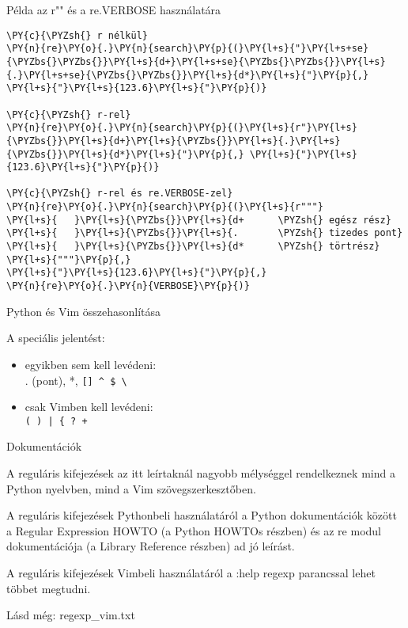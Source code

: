 \documentclass[
    ignorenonframetext
    ]{beamer}
\begin{document}
\begin{frame}
    [fragile]{Példa az r"" és a re.VERBOSE használatára}


\begin{Verbatim}[commandchars=\\\{\}]
\PY{c}{\PYZsh{} r nélkül}
\PY{n}{re}\PY{o}{.}\PY{n}{search}\PY{p}{(}\PY{l+s}{"}\PY{l+s+se}{\PYZbs{}\PYZbs{}}\PY{l+s}{d+}\PY{l+s+se}{\PYZbs{}\PYZbs{}}\PY{l+s}{.}\PY{l+s+se}{\PYZbs{}\PYZbs{}}\PY{l+s}{d*}\PY{l+s}{"}\PY{p}{,} \PY{l+s}{"}\PY{l+s}{123.6}\PY{l+s}{"}\PY{p}{)}

\PY{c}{\PYZsh{} r-rel}
\PY{n}{re}\PY{o}{.}\PY{n}{search}\PY{p}{(}\PY{l+s}{r"}\PY{l+s}{\PYZbs{}}\PY{l+s}{d+}\PY{l+s}{\PYZbs{}}\PY{l+s}{.}\PY{l+s}{\PYZbs{}}\PY{l+s}{d*}\PY{l+s}{"}\PY{p}{,} \PY{l+s}{"}\PY{l+s}{123.6}\PY{l+s}{"}\PY{p}{)}

\PY{c}{\PYZsh{} r-rel és re.VERBOSE-zel}
\PY{n}{re}\PY{o}{.}\PY{n}{search}\PY{p}{(}\PY{l+s}{r"""}
\PY{l+s}{   }\PY{l+s}{\PYZbs{}}\PY{l+s}{d+      \PYZsh{} egész rész}
\PY{l+s}{   }\PY{l+s}{\PYZbs{}}\PY{l+s}{.       \PYZsh{} tizedes pont}
\PY{l+s}{   }\PY{l+s}{\PYZbs{}}\PY{l+s}{d*      \PYZsh{} törtrész}
\PY{l+s}{"""}\PY{p}{,}
\PY{l+s}{"}\PY{l+s}{123.6}\PY{l+s}{"}\PY{p}{,}
\PY{n}{re}\PY{o}{.}\PY{n}{VERBOSE}\PY{p}{)}
\end{Verbatim}
\end{frame}

\begin{frame}[fragile]
    {Python és Vim összehasonlítása}

    A speciális jelentést:
    \begin{itemize}
        \item egyikben sem kell levédeni:\\
            . (pont), *, \verb'[] ^ $ \'
        \item csak Vimben kell levédeni:\\
            \verb!( ) | { ? +!
    \end{itemize}
\end{frame}

\begin{frame}
    {Dokumentációk}

    A reguláris kifejezések az itt leírtaknál nagyobb mélységgel
    rendelkeznek mind a Python nyelvben, mind a Vim szövegszerkesztőben.

    A reguláris kifejezések Pythonbeli használatáról a Python
    dokumentációk között a Regular Expression HOWTO (a Python HOWTOs
    részben) és az re modul dokumentációja (a Library Reference részben)
    ad jó leírást.

    A reguláris kifejezések Vimbeli használatáról a :help regexp
    parancssal lehet többet megtudni.

    Lásd még: regexp\_vim.txt
\end{frame}
\end{document}
